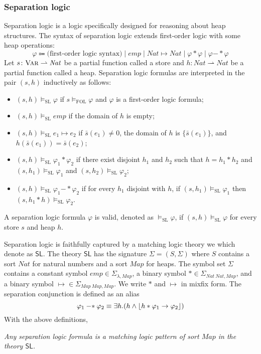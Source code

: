 \documentclass[acmsmall,review,anonymous]{acmart}
\newcommand{\imp}{\to}
\newcommand{\Var}{\textnormal{\textsc{Var}}}
\newcommand{\sig}{\mathbb{\Sigma}}
\newcommand{\MLSL}{\mathsf{SL}}
\DeclarePairedDelimiter{\floor}{\lfloor}{\rfloor}
\newcommand{\Nat}{\mathit{Nat}}
\newcommand{\Map}{\mathit{Map}}
\newcommand{\emp}{\mathit{emp}}
\newcommand{\simp}{\mathbin{-*}}
\newcommand{\merge}{\mathbin{*}}
\newcommand{\pto}{\rightharpoonup}
\newcommand{\SL}{{\text{SL}}}
\newcommand{\FOL}{{\text{FOL}}}
\begin{document}
\subsubsection{Separation logic}
\label{sec_separation_logic}

Separation logic is a logic specifically designed for reasoning about
heap structures.
The syntax of separation logic extends first-order logic with
some heap operations:
\begin{equation*}
\varphi \Coloneqq
\text{(first-order logic syntax)}
\mid \emp \mid \Nat \mapsto \Nat \mid \varphi \merge \varphi
\mid \varphi \simp \varphi
\end{equation*}
Let $s \colon \Var \pto \Nat$ be a partial function called a store
and $h \colon \Nat \pto \Nat$ be a partial function called a heap.
Separation logic formulas are interpreted in the pair $(s,h)$
inductively as follows:
\begin{itemize}
\item $(s,h) \vDash_{\SL} \varphi$
      if $s \vDash_{\FOL} \varphi$ and $\varphi$ is a first-order logic formula;
\item $(s,h) \vDash_\SL \emp$ if the domain of $h$ is empty;
\item $(s,h) \vDash_\SL e_1 \mapsto e_2$
      if $\bar{s}(e_1) \neq 0$, the domain of $h$ is $\{ \bar{s}(e_1) \}$, and 
      $h( \bar{s}(e_1) ) = \bar{s}(e_2)$;
\item $(s,h) \vDash_\SL \varphi_1 \merge \varphi_2$ if
      there exist disjoint $h_1$ and $h_2$ such that
      $h = h_1 \merge h_2$ and
      $(s,h_1) \vDash_\SL \varphi_1$
      and $(s, h_2) \vDash_\SL \varphi_2$;
\item $(s,h) \vDash_\SL \varphi_1 \simp \varphi_2$ if
      for every $h_1$ disjoint with $h$,
      if $(s,h_1) \vDash_\SL \varphi_1$ then
      $(s,h_1 \merge h) \vDash_\SL \varphi_2$.
\end{itemize}
A separation logic formula $\varphi$ is valid,
denoted as $\vDash_\SL \varphi$,
if $(s,h)\vDash_\SL \varphi$ for every store $s$ and heap $h$.

Separation logic is faithfully captured by a matching logic theory
we which denote as $\MLSL$.
The theory $\MLSL$ has the signature
$\sig = (S, \Sigma)$ 
where $S$ contains a sort $\Nat$ for natural numbers and
a sort $\Map$ for heaps. 
The symbol set $\Sigma$ contains
a constant symbol $\emp \in \Sigma_{\lambda,\Map}$,
a binary symbol $* \in \Sigma_{\Nat\ \Nat,\Map}$,
and a binary symbol $\mapsto \in \Sigma_{\Map\ \Map,\Map}$.
We write $*$ and $\mapsto$ in mixfix form.
The separation conjunction is defined as an alias
\begin{equation*}
\varphi_1 \simp \varphi_2 \equiv
\exists h . ( h \wedge \floor{ h \merge \varphi_1 \imp \varphi_2 } )
\end{equation*}
With the above definitions,
\begin{center}
\em Any separation logic formula is a matching logic pattern of sort $\Map$
in the theory $\MLSL$.
\end{center}
\end{document}
